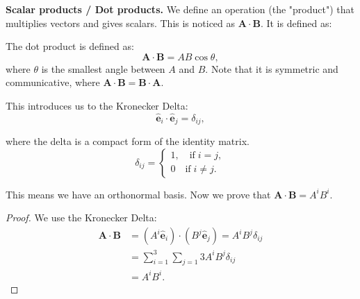 \documentclass[10pt]{article}
\begin{document}
	\textbf{Scalar products / Dot products.} We define an operation (the "product") that multiplies vectors and gives scalars. This is noticed as $\mathbf{A} \cdot \mathbf{B}$. It is defined as:
	\begin{definition}
		The dot product is defined as:
		\begin{equation}
		  \mathbf{A} \cdot \mathbf{B} = AB\cos \theta,
		\end{equation}
		where $\theta$ is the smallest angle between $A$ and $B$. Note that it is symmetric and communicative, where $\mathbf{A} \cdot \mathbf{B} = \mathbf{B} \cdot \mathbf{A}$.
	\end{definition}

	This introduces us to the Kronecker Delta:
	\begin{equation}
	  \hat{\mathbf{e}}_{i} \cdot \hat{\mathbf{e}}_{j} = \delta_{ij},
	\end{equation}
	
	where the delta is a compact form of the identity matrix.
	\begin{equation}
	  \delta_{ij} = \begin{cases} 1, \quad \text{if} \; i=j, \\[2mm] 0 \quad \text{if} \; i \neq j.  \end{cases}
	\end{equation}

	This means we have an orthonormal basis. Now we prove that $\mathbf{A} \cdot \mathbf{B} = A^{i}B^{i}$. 
	\begin{proof}
		We use the Kronecker Delta:
		\begin{equation}
		  \begin{aligned}
		  \mathbf{A} \cdot \mathbf{B} &= (A^{i}\hat{\mathbf{e}}_{i}) \cdot (B^{j}\hat{\mathbf{e}}_{j}) = A^{i}B^{j}\delta_{ij} \\[2mm]
		  &= \sum_{i=1}^{3} \sum_{j=1}{3} A^{i}B^{j}\delta_{ij} \\[2mm]
		  &= A^{i}B^{i}.
		  \end{aligned} 
		\end{equation}
	\end{proof}
\end{document}
